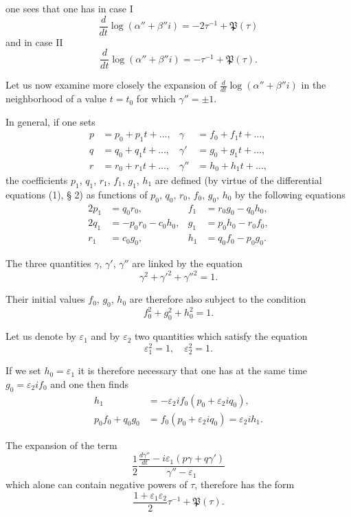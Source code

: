 \documentclass{article}
\begin{document}
one sees that one has in case I
\[
\frac{d}{dt}\log(\alpha'' + \beta''i) = -2\tau^{-1} + \mathfrak{P}(\tau)
\]
and in case II
\[
\frac{d}{dt}\log(\alpha'' + \beta''i) = -\tau^{-1} + \mathfrak{P}(\tau).
\]

Let us now examine more closely the expansion of $\frac{d}{dt}\log(\alpha'' + \beta''i)$ in the neighborhood of a value $t = t_0$ for which $\gamma'' = \pm 1$.

In general, if one sets
\begin{align*}
p &= p_0 + p_1t + \ldots, & \gamma &= f_0 + f_1t + \ldots, \\
q &= q_0 + q_1t + \ldots, & \gamma' &= g_0 + g_1t + \ldots, \\
r &= r_0 + r_1t + \ldots, & \gamma'' &= h_0 + h_1t + \ldots,
\end{align*}
the coefficients $p_1$, $q_1$, $r_1$, $f_1$, $g_1$, $h_1$ are defined (by virtue of the differential equations (1), § 2) as functions of $p_0$, $q_0$, $r_0$, $f_0$, $g_0$, $h_0$ by the following equations
\begin{align*}
2p_1 &= q_0r_0, & f_1 &= r_0g_0 - q_0h_0, \\
2q_1 &= -p_0r_0 - c_0h_0, & g_1 &= p_0h_0 - r_0f_0, \\
r_1 &= c_0g_0, & h_1 &= q_0f_0 - p_0g_0.
\end{align*}

The three quantities $\gamma$, $\gamma'$, $\gamma''$ are linked by the equation
\[
\gamma^2 + \gamma'^2 + \gamma''^2 = 1.
\]

Their initial values $f_0$, $g_0$, $h_0$ are therefore also subject to the condition
\[
f_0^2 + g_0^2 + h_0^2 = 1.
\]

Let us denote by $\varepsilon_1$ and by $\varepsilon_2$ two quantities which satisfy the equation
\[
\varepsilon_1^2 = 1, \quad \varepsilon_2^2 = 1.
\]

If we set $h_0 = \varepsilon_1$ it is therefore necessary that one has at the same time $g_0 = \varepsilon_2if_0$ and one then finds
\begin{align*}
h_1 &= -\varepsilon_2if_0(p_0 + \varepsilon_2iq_0), \\
p_0f_0 + q_0g_0 &= f_0(p_0 + \varepsilon_2iq_0) = \varepsilon_2ih_1.
\end{align*}


The expansion of the term
\[
\frac{1}{2}\frac{\frac{d\gamma''}{dt} - i\varepsilon_1(p\gamma + q\gamma')}{\gamma'' - \varepsilon_1}
\]
which alone can contain negative powers of $\tau$, therefore has the form
\[
\frac{1 + \varepsilon_1\varepsilon_2}{2}\tau^{-1} + \mathfrak{P}(\tau).
\]
\end{document}
